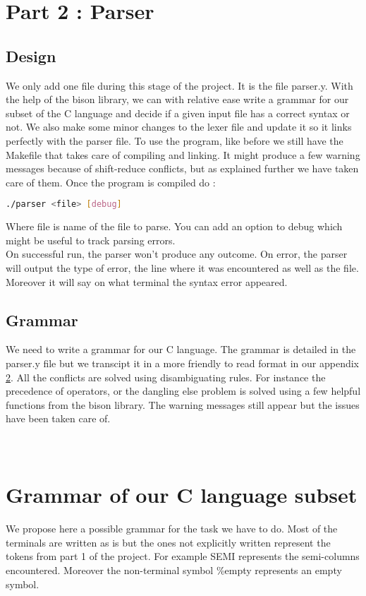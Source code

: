 \documentclass{article}
\begin{document}
\section{Part 2 : Parser}
\subsection{Design}
We only add one file during this stage of the project. It is the file parser.y. With the help of the bison library, we can with relative ease write a grammar for our subset of the C language and decide if a given input file has a correct syntax or not. We also make some minor changes to the lexer file and update it so it links perfectly with the parser file. 
To use the program, like before we still have the Makefile that takes care of compiling and linking. It might produce a few warning messages because of shift-reduce conflicts, but as explained further we have taken care of them. 
Once the program is compiled do : \begin{lstlisting}[language=bash]
./parser <file> [debug]
\end{lstlisting}
Where file is name of the file to parse. You can add an option to debug which might be useful to track parsing errors. \\
On successful run, the parser won't produce any outcome. On error, the parser will output the type of error, the line where it was encountered as well as the file. Moreover it will say on what terminal the syntax error appeared. 
\subsection{Grammar}
We need to write a grammar for our C language. The grammar is detailed in the parser.y file but we transcipt it in a more friendly to read format in our appendix \ref{grammar}. All the conflicts are solved using disambiguating rules. For instance the precedence of operators, or the dangling else problem is solved using a few helpful functions from the bison library. The warning messages still appear but the issues have been taken care of. 






\appendix
\section{\\Grammar of our C language subset}
\label{grammar}
We propose here a possible grammar for the task we have to do. Most of the terminals are written as is but the ones not explicitly written represent the tokens from part 1 of the project. For example {\sc SEMI} represents the semi-columns encountered. Moreover the non-terminal symbol {\%empty} represents an empty symbol. 
\end{document}
